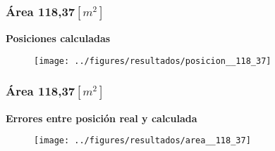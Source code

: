 \documentclass[mathserif]{beamer}
\begin{document}
\begin{frame}
\frametitle{Área 118,37$[m^2]$}

\textbf{Posiciones calculadas}

\begin{figure}
\texttt{[image: ../figures/resultados/posicion\_\_118\_37]}
\end{figure}


\end{frame}


\begin{frame}
\frametitle{Área 118,37$[m^2]$}

\textbf{Errores entre posición real y calculada}

\begin{figure}
\texttt{[image: ../figures/resultados/area\_\_118\_37]}
\end{figure}



\end{frame}

\end{document}
